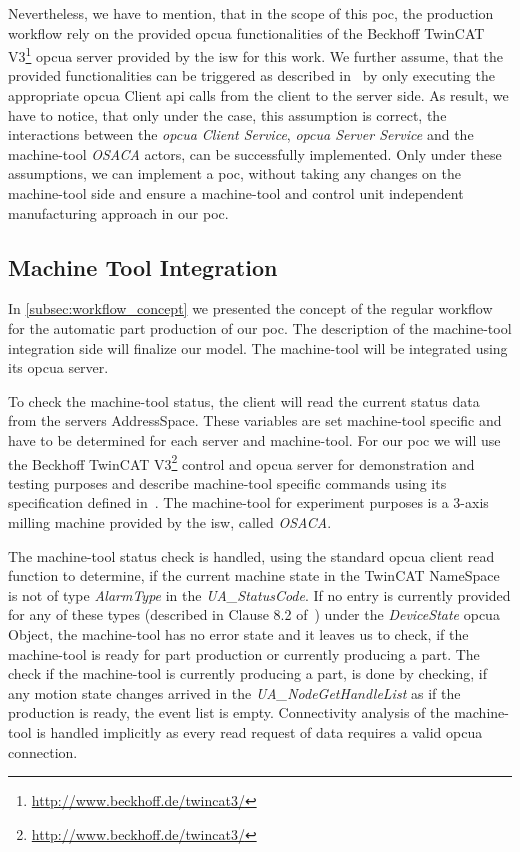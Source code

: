 \documentclass[
a4paper,
twoside,
headsepline,
cleardoublepage=empty,
parskip=half,
draft=false
]{scrbook}
\begin{document}
				Nevertheless, we have to mention, that in the scope of this \gls{poc}, the production workflow rely on the provided \gls{opcua} functionalities of the Beckhoff TwinCAT V3\footnote{\url{http://www.beckhoff.de/twincat3/}} \gls{opcua} server provided by the \gls{isw} for this work. We further assume, that the provided functionalities can be triggered as described in~\cite{twincat2018} by only executing the appropriate \gls{opcua} Client \gls{api} calls from the client to the server side. As result, we have to notice, that only under the case, this assumption is correct, the interactions between the \textit{\gls{opcua} Client Service}, \textit{\gls{opcua} Server Service} and the machine-tool \textit{OSACA} actors, can be successfully implemented. Only under these assumptions, we can implement a \gls{poc}, without taking any changes on the machine-tool side and ensure a machine-tool and control unit independent manufacturing approach in our \gls{poc}.

			\subsection{Machine Tool Integration} \label{subsec:machine_tool_intergation}

				In \cref{subsec:workflow_concept} we presented the concept of the regular workflow for the automatic part production of our \gls{poc}. The description of the machine-tool integration side will finalize our model. The machine-tool will be integrated using its \gls{opcua} server.

				To check the machine-tool status, the client will read the current status data from the servers AddressSpace. These variables are set machine-tool specific and have to be determined for each server and machine-tool. For our \gls{poc} we will use the Beckhoff TwinCAT V3\footnote{\url{http://www.beckhoff.de/twincat3/}} control and \gls{opcua} server for demonstration and testing purposes and describe machine-tool specific commands using its specification defined in~\cite{twincat2018}. The machine-tool for experiment purposes is a 3-axis milling machine provided by the \gls{isw}, called \textit{OSACA}.

				The machine-tool status check is handled, using the standard \gls{opcua} client read function to determine, if the current machine state in the TwinCAT NameSpace is not of type \textit{AlarmType} in the \textit{UA\_StatusCode}. If no entry is currently provided for any of these types (described in Clause 8.2 of~\cite{twincat2018}) under the \textit{DeviceState} \gls{opcua} Object, the machine-tool has no error state and it leaves us to check, if the machine-tool is ready for part production or currently producing a part. The check if the machine-tool is currently producing a part, is done by checking, if any motion state changes arrived in the \textit{UA\_NodeGetHandleList} as if the production is ready, the event list is empty. Connectivity analysis of the machine-tool is handled implicitly as every read request of data requires a valid \gls{opcua} connection.
\end{document}
